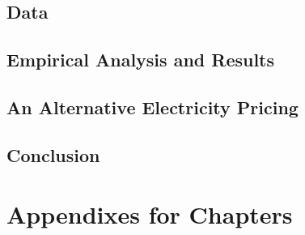 \documentclass[11pt, draftcls]{ucdavisthesis}
\begin{document}
\section{Data}
\label{C2-Section:Data}



\section{Empirical Analysis and Results}
\label{C2-Section:Empirical-Analysis-and-Results}



\section{An Alternative Electricity Pricing}
\label{C2-Section:An-Alternative-Electricity-Pricing}



\section{Conclusion}
\label{C2-Section:Conclusion}





\appendix
\chapter{Appendixes for Chapters}
\label{Chapter:Appendixes-for-Chapters}





\end{document}
